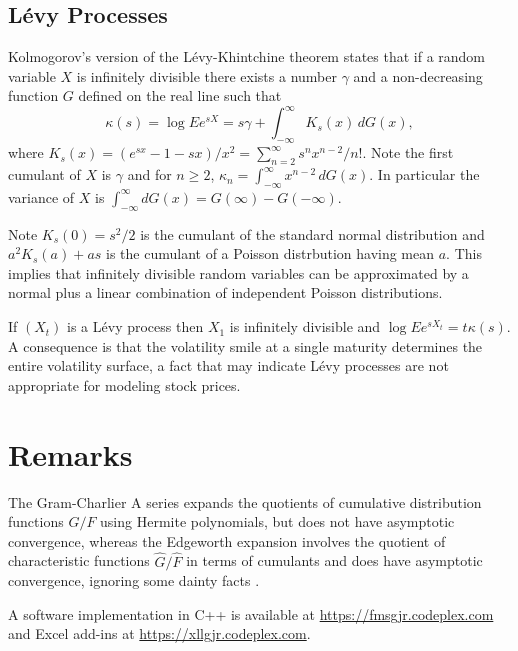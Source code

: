 \documentclass[11pt]{article}
\newcommand{\Var}{\mathop{\rm{Var}}}
\theoremstyle{definition}
\begin{document}
\subsection{L\'evy Processes}



Kolmogorov's version of the L\'evy-Khintchine theorem\cite{Kol1992}
states that if a random variable \(X\) is infinitely divisible
there exists a number \(\gamma\) and a non-decreasing function
\(G\) defined on the real line such that
\[
\kappa(s) = \log Ee^{sX} = s\gamma + \int_{-\infty}^\infty K_s(x)\,dG(x),
\]
where \(K_s(x) = (e^{sx} - 1 - sx)/x^2 = \sum_{n=2}^\infty s^nx^{n-2}/n!\).
Note the first
cumulant of \(X\) is \(\gamma\) and for \(n\ge 2\),
\(\kappa_n = \int_{-\infty}^\infty x^{n-2}\,dG(x)\). In particular
the variance of \(X\) is 
\(\int_{-\infty}^\infty dG(x) = G(\infty) - G(-\infty)\).

Note \(K_s(0) = s^2/2\) is the cumulant of the standard normal
distribution and \(a^2K_s(a) + as\) is the cumulant of a
Poisson distrbution having mean \(a\). This implies
that infinitely divisible random variables can be
approximated by a normal plus a linear combination of
independent Poisson distributions.

If \((X_t)\) is a L\'evy process then \(X_1\) is
infinitely divisible and \(\log Ee^{sX_t} = t\kappa(s)\).
A consequence is that the volatility smile at a single
maturity determines the entire volatility surface, a fact that
may indicate L\'evy processes are not appropriate for
modeling stock prices.

%

\section{Remarks}
The Gram-Charlier A series expands the quotients of cumulative
distribution functions \(G/F\) using Hermite polynomials, but does not
have asymptotic convergence, whereas the Edgeworth expansion involves
the quotient of characteristic functions \(\hat G/\hat F\) in terms of
cumulants and does have asymptotic convergence, ignoring some dainty
facts \cite{Pet1975}.

A software implementation in C++ is available at
\url{https://fmsgjr.codeplex.com} and Excel add-ins
at \url{https://xllgjr.codeplex.com}.



\end{document}

